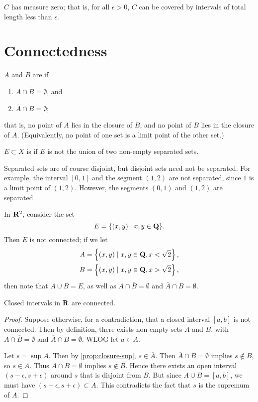 \begin{proposition}
$C$ has measure zero; that is, for all $\epsilon>0$, $C$ can be covered by intervals of total length less than $\epsilon$.
\end{proposition}
\pagebreak

\section{Connectedness}
\begin{definition}[Connectedness]
$A$ and $B$ are  if
\begin{enumerate}[label=(\roman*)]
\item $A\cap\overline{B}=\emptyset$, and
\item $\overline{A}\cap B=\emptyset$;
\end{enumerate}
that is, no point of $A$ lies in the closure of $B$, and no point of $B$ lies in the closure of $A$. (Equivalently, no point of one set is a limit point of the other set.)

$E\subset X$ is  if $E$ is not the union of two non-empty separated sets. 
\end{definition}

\begin{remark}
Separated sets are of course disjoint, but disjoint sets need not be separated. For example, the interval $[0,1]$ and the segment $(1,2)$ are not separated, since $1$ is a limit point of $(1,2)$. However, the segments $(0,1)$ and $(1,2)$ are separated.
\end{remark}

\begin{example}
In $\mathbf R^2$, consider the set
\[E=\{(x,y)\mid x,y\in\mathbf Q\}.\]
Then $E$ is not connected; if we let
\begin{align*}
A&=\left\{(x,y)\mid x,y\in\mathbf Q,x<\sqrt{2}\right\},\\
B&=\left\{(x,y)\mid x,y\in\mathbf Q,x>\sqrt{2}\right\},
\end{align*}
then note that $A\cup B=E$, as well as $A\cap\overline{B}=\emptyset$ and $\overline{A}\cap B=\emptyset$.
\end{example}

\begin{proposition}
Closed intervals in $\mathbf R$ are connected.
\end{proposition}

\begin{proof}
Suppose otherwise, for a contradiction, that a closed interval $[a,b]$ is not connected. Then by definition, there exists non-empty sets $A$ and $B$, with $A\cap\overline{B}=\emptyset$ and $\overline{A}\cap B=\emptyset$. WLOG let $a\in A$.

Let $s=\sup A$. Then by \cref{prop:closure-sup}, $s\in\overline{A}$. Then $\overline{A}\cap B=\emptyset$ implies $s\notin B$, so $s\in A$. Thus $A\cap\overline{B}=\emptyset$ implies $s\notin\overline{B}$. Hence there exists an open interval $(s-\epsilon,s+\epsilon)$ around $s$ that is disjoint from $B$. But since $A\cup B=[a,b]$, we must have $(s-\epsilon,s+\epsilon)\subset A$. This contradicts the fact that $s$ is the supremum of $A$. 
\end{proof}

